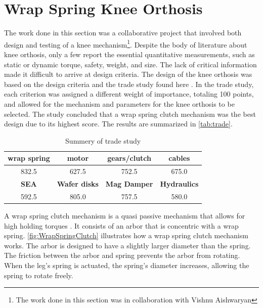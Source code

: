 
\section{Wrap Spring Knee Orthosis}
\label{sec:knee}

The work done in this section was a collaborative project that involved both design and testing of a knee mechanism\footnote{The work done in this section was in collaboration with  Vishnu Aishwaryan}. 
Despite the body of literature about knee orthosis, only a few report the essential quantitative measurements, such as static or dynamic torque, safety, weight, and size. The lack of critical information made it difficult to arrive at design criteria. The design of the knee orthosis was based on the design criteria and the trade study found here \cite{subra2020design} \cite{mani2020design}. In the trade study, each criterion was assigned a different weight of importance, totaling 100 points, and allowed for the mechanism and parameters for the knee orthosis to be selected. The study concluded that a wrap spring clutch mechanism was the best design due to its highest score. The results are summarized in \autoref{tab:trade}.


\begin{table}[h!]
  \begin{center}
    \begin{tabular}{c|c|c|c} %
      \textbf{wrap spring} & \textbf{motor} & \textbf{gears/clutch} & \textbf{cables} \\
      \hline \hline
      832.5 & 627.5 & 752.5 & 675.0 \\
      \hline
      \textbf{SEA}  & \textbf{Wafer disks}  & \textbf{Mag Damper} & \textbf{Hydraulics} \\
      \hline \hline
      592.5 & 805.0 & 757.5 & 580.0\\
    \end{tabular}
  \end{center}
      \caption[Knee Trade Study]{Summery of trade study}
    \label{tab:trade}
\end{table}


A wrap spring clutch mechanism is a quasi passive mechanism that allows for high holding torques \cite{irby1999optimization} \cite{tung2013design}. It consists of an arbor that is concentric with a wrap spring. \autoref{fig:WrapSpringClutch} illustrates how a wrap spring clutch mechanism works. The arbor is designed to have a slightly larger diameter than the spring. The friction between the arbor and spring prevents the arbor from rotating. When the leg's spring is actuated, the spring's diameter increases, allowing the spring to rotate freely. 

